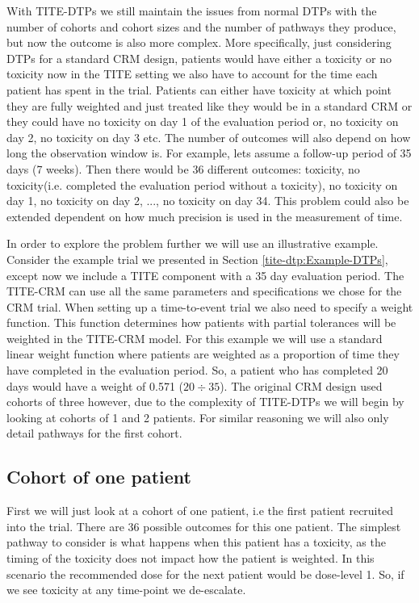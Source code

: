 With TITE-DTPs we still maintain the issues from normal DTPs with the number of cohorts and cohort sizes and the number of pathways they produce, but now the outcome is also more complex. More specifically, just considering DTPs for a standard CRM design, patients would have either a toxicity or no toxicity now in the TITE setting we also have to account for the time each patient has spent in the trial. Patients can either have toxicity at which point they are fully weighted and just treated like they would be in a standard CRM or they could have no toxicity on day 1 of the evaluation period or, no toxicity on day 2, no toxicity on day 3 etc. The number of outcomes will also depend on how long the observation window is. For example, lets assume a follow-up period of 35 days (7 weeks). Then there would be 36 different outcomes: toxicity, no toxicity(i.e. completed the evaluation period without a toxicity), no toxicity on day 1, no toxicity on day 2, ..., no toxicity on day 34. This problem could also be extended dependent on how much precision is used in the measurement of time. 

In order to explore the problem further we will use an illustrative example. Consider the example trial we presented in Section \ref{tite-dtp:Example-DTPs}, except now we include a TITE component with a 35 day evaluation period. The TITE-CRM can use all the same parameters and specifications we chose for the CRM trial. When setting up a time-to-event trial we also need to specify a weight function. This function determines how patients with partial tolerances will be weighted in the TITE-CRM model. For this example we will use a standard linear weight function where patients are weighted as a proportion of time they have completed in the evaluation period. So, a patient who has completed 20 days would have a weight of 0.571 ($20 \div 35$). The original CRM design used cohorts of three however, due to the complexity of TITE-DTPs we will begin by looking at cohorts of 1 and 2 patients. For similar reasoning we will also only detail pathways for the first cohort. 


\subsection{Cohort of one patient}
\label{tite-dtp:TITE-DTPs-c1}
First we will just look at a cohort of one patient, i.e the first patient recruited into the trial. There are 36 possible outcomes for this one patient. The simplest pathway to consider is what happens when this patient has a toxicity, as the timing of the toxicity does not impact how the patient is weighted. In this scenario the recommended dose for the next patient would be dose-level 1. So, if we see toxicity at any time-point we de-escalate.   

